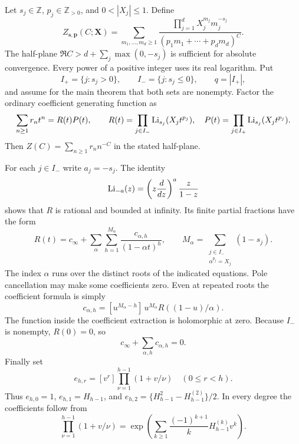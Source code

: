 \documentclass[11pt]{article}
\numberwithin{equation}{section}
\theoremstyle{definition}
\theoremstyle{remark}
\begin{document}
Let $s_j\in\mathbb Z$, $p_j\in\mathbb Z_{>0}$, and
$0<|X_j|\leq1$.  Define
\begin{equation}\label{mx:Z}
 Z_{\mathbf s,\mathbf p}(C;\mathbf X)
 =\sum_{m_1,\ldots,m_d\geq1}
  \frac{\prod_{j=1}^dX_j^{m_j}m_j^{-s_j}}
       {(p_1m_1+\cdots+p_dm_d)^C}.
\end{equation}
The half-plane
$\Re C>d+\sum_j\max(0,-s_j)$ is sufficient for absolute
convergence.  Every power of a positive integer uses its real
logarithm.  Put
\[
 I_+=\{j:s_j>0\},\qquad I_-=\{j:s_j\leq0\},\qquad
 q=|I_+|,
\]
and assume for the main theorem that both sets are nonempty.  Factor
the ordinary coefficient generating function as
\begin{equation}\label{mx:factor}
 \sum_{n\geq1}r_nt^n=R(t)P(t),\qquad
 R(t)=\prod_{j\in I_-}\operatorname{Li}_{s_j}(X_jt^{p_j}),\quad
 P(t)=\prod_{j\in I_+}\operatorname{Li}_{s_j}(X_jt^{p_j}).
\end{equation}
Then $Z(C)=\sum_{n\geq1}r_nn^{-C}$ in the stated half-plane.

For each $j\in I_-$ write $a_j=-s_j$.  The identity
\[
 \operatorname{Li}_{-a}(z)=\left(z\frac{d}{dz}\right)^a\frac z{1-z}
\]
shows that $R$ is rational and bounded at infinity.  Its finite partial
fractions have the form
\begin{equation}\label{mx:partial}
 R(t)=c_\infty+
       \sum_\alpha\sum_{h=1}^{M_\alpha}
          \frac{c_{\alpha,h}}{(1-\alpha t)^h},\qquad
 M_\alpha=\sum_{\substack{j\in I_-\\\alpha^{p_j}=X_j}}(1-s_j).
\end{equation}
The index $\alpha$ runs over the distinct roots of the indicated
equations.  Pole cancellation may make some coefficients zero.  Even
at repeated roots the coefficient formula is simply
\begin{equation}\label{mx:polecoeff}
 c_{\alpha,h}
 =[u^{M_\alpha-h}]\,u^{M_\alpha}R((1-u)/\alpha).
\end{equation}
The function inside the coefficient extraction is holomorphic at zero.
Because $I_-$ is nonempty, $R(0)=0$, so
\begin{equation}\label{mx:constantcancel}
 c_\infty+\sum_{\alpha,h}c_{\alpha,h}=0.
\end{equation}
Finally set
\begin{equation}\label{mx:e}
 e_{h,r}=[v^r]\prod_{\nu=1}^{h-1}(1+v/\nu)
 \quad(0\leq r<h).
\end{equation}
Thus $e_{h,0}=1$, $e_{h,1}=H_{h-1}$, and
$e_{h,2}=\{H_{h-1}^2-H_{h-1}^{(2)}\}/2$.  In every degree the
coefficients follow from
\[
 \prod_{\nu=1}^{h-1}(1+v/\nu)
 =\exp\!\left(\sum_{k\geq1}
          \frac{(-1)^{k+1}}kH_{h-1}^{(k)}v^k\right).
\]
\end{document}
